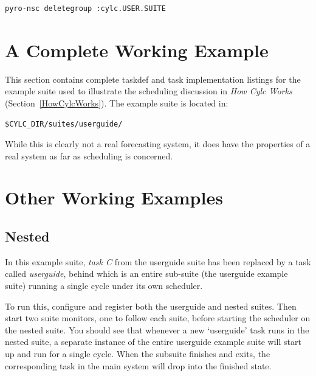 \documentclass[11pt,a4paper]{article}
\begin{document}
\begin{lstlisting}
pyro-nsc deletegroup :cylc.USER.SUITE
\end{lstlisting}

\section{A Complete Working Example}
\label{ACompleteWorkingExample}

This section contains complete taskdef and task implementation listings
for the example suite used to illustrate the scheduling discussion in
{\em How Cylc Works} (Section~\ref{HowCylcWorks}). The example suite
is located in:

\begin{lstlisting}
$CYLC_DIR/suites/userguide/
\end{lstlisting}

 While this is clearly not a real forecasting system, it does have the
 properties of a real system as far as scheduling is concerned.  




\pagebreak


\pagebreak
\section{Other Working Examples}
\label{OtherWorkingExamples}

\subsection{Nested}

In this example suite, {\em task C} from the userguide suite has been
replaced by a task called {\em userguide}, behind which is an entire
sub-suite (the userguide example suite) running a single cycle under
its own scheduler.

To run this, configure and register both the userguide and nested
suites. Then start two suite monitors, one to follow each suite,
before starting the scheduler on the nested suite. You should see that 
whenever a new `userguide' task runs in the nested suite, a separate
instance of the entire userguide example suite will start up and run
for a single cycle. When the subsuite finishes and exits, the
corresponding task in the main system will drop into the finished state.
\end{document}
